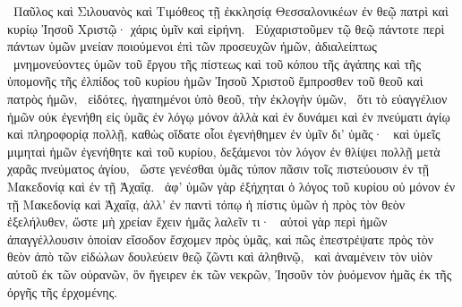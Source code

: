 ~Παῦλος καὶ Σιλουανὸς καὶ Τιμόθεος τῇ ἐκκλησίᾳ Θεσσαλονικέων ἐν θεῷ πατρὶ καὶ κυρίῳ Ἰησοῦ Χριστῷ· χάρις ὑμῖν καὶ εἰρήνη.
~Εὐχαριστοῦμεν τῷ θεῷ πάντοτε περὶ πάντων ὑμῶν μνείαν ποιούμενοι ἐπὶ τῶν προσευχῶν ἡμῶν, ἀδιαλείπτως
~μνημονεύοντες ὑμῶν τοῦ ἔργου τῆς πίστεως καὶ τοῦ κόπου τῆς ἀγάπης καὶ τῆς ὑπομονῆς τῆς ἐλπίδος τοῦ κυρίου ἡμῶν Ἰησοῦ Χριστοῦ ἔμπροσθεν τοῦ θεοῦ καὶ πατρὸς ἡμῶν,
~εἰδότες,  ἠγαπημένοι ὑπὸ θεοῦ, τὴν ἐκλογὴν ὑμῶν,
~ὅτι τὸ εὐαγγέλιον ἡμῶν οὐκ ἐγενήθη εἰς ὑμᾶς ἐν λόγῳ μόνον ἀλλὰ καὶ ἐν δυνάμει καὶ ἐν πνεύματι ἁγίῳ καὶ πληροφορίᾳ πολλῇ, καθὼς οἴδατε οἷοι ἐγενήθημεν ἐν ὑμῖν δι’ ὑμᾶς·
~καὶ ὑμεῖς μιμηταὶ ἡμῶν ἐγενήθητε καὶ τοῦ κυρίου, δεξάμενοι τὸν λόγον ἐν θλίψει πολλῇ μετὰ χαρᾶς πνεύματος ἁγίου,
~ὥστε γενέσθαι ὑμᾶς τύπον πᾶσιν τοῖς πιστεύουσιν ἐν τῇ Μακεδονίᾳ καὶ ἐν τῇ Ἀχαΐᾳ.
~ἀφ’ ὑμῶν γὰρ ἐξήχηται ὁ λόγος τοῦ κυρίου οὐ μόνον ἐν τῇ Μακεδονίᾳ καὶ Ἀχαΐᾳ, ἀλλ’ ἐν παντὶ τόπῳ ἡ πίστις ὑμῶν ἡ πρὸς τὸν θεὸν ἐξελήλυθεν, ὥστε μὴ χρείαν ἔχειν ἡμᾶς λαλεῖν τι·
~αὐτοὶ γὰρ περὶ ἡμῶν ἀπαγγέλλουσιν ὁποίαν εἴσοδον ἔσχομεν πρὸς ὑμᾶς, καὶ πῶς ἐπεστρέψατε πρὸς τὸν θεὸν ἀπὸ τῶν εἰδώλων δουλεύειν θεῷ ζῶντι καὶ ἀληθινῷ,
~καὶ ἀναμένειν τὸν υἱὸν αὐτοῦ ἐκ τῶν οὐρανῶν, ὃν ἤγειρεν ἐκ τῶν νεκρῶν, Ἰησοῦν τὸν ῥυόμενον ἡμᾶς ἐκ τῆς ὀργῆς τῆς ἐρχομένης.

